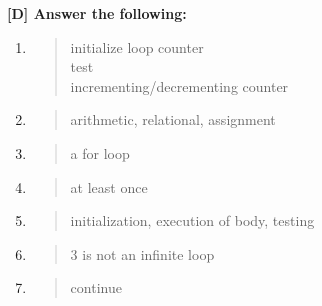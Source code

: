 \documentclass{report}
\begin{document}
\textbf{[D] Answer the following:}
\begin{enumerate}
    \renewcommand{\labelenumi}{\alph{enumi}}
  \item \begin{quote}
      initialize loop counter\\
      test\\
      incrementing/decrementing counter\\
  \end{quote}

  \item \begin{quote}
      arithmetic, relational, assignment\\
  \end{quote}

  \item \begin{quote}
      a for loop\\
  \end{quote}

  \item \begin{quote}
      at least once\\
  \end{quote}

  \item \begin{quote}
      initialization, execution of body, testing\\
  \end{quote}

  \item \begin{quote}
      3 is not an infinite loop\\
  \end{quote}

  \item \begin{quote}
      continue\\
  \end{quote}
\end{enumerate}
\end{document}
